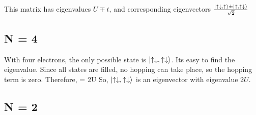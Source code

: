 \documentclass[12pt]{article}
\begin{document}
\begin{itemize}
\beq
{}
\eeq
\end{itemize}
This matrix has eigenvalues \(U \mp t\), and corresponding eigenvectors \(\frac{\ket{\uparrow\downarrow,\uparrow} \pm \ket{\uparrow,\uparrow\downarrow}}{\sqrt{2}}\)

\subsection{N = 4}
With four electrons, the only possible state is \(\ket{\uparrow\downarrow,\uparrow\downarrow}\). Its easy to find the eigenvalue. Since all states are filled, no hopping can take place, so the hopping term is zero. Therefore,
\beq
\ham \ket{\uparrow\downarrow,\uparrow\downarrow} = 2U \ket{\uparrow\downarrow,\uparrow\downarrow}
\eeq
So, \(\ket{\uparrow\downarrow,\uparrow\downarrow}\) is an eigenvector with eigenvalue \(2U\).

\subsection{N = 2}
\end{document}
